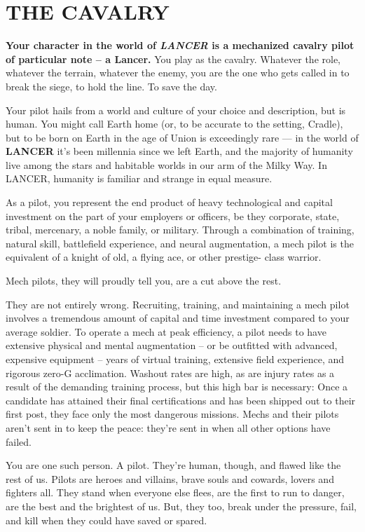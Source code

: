 \section{THE CAVALRY}

\textbf{Your character in the world of \textit{LANCER} is a mechanized cavalry pilot of particular note -- a
Lancer.} You play as the cavalry. Whatever the role, whatever the terrain, whatever the enemy,
you are the one who gets called in to break the siege, to hold the line. To save the day.

Your pilot hails from a world and culture of your choice and description, but is human. You might
call Earth home (or, to be accurate to the setting, Cradle), but to be born on Earth in the age of
Union is exceedingly rare — in the world of \textbf{LANCER} it’s been millennia since we left Earth, and
the majority of humanity live among the stars and habitable worlds in our arm of the Milky Way.
In LANCER, humanity is familiar and strange in equal measure.

As a pilot, you represent the end product of heavy technological and capital investment on the
part of your employers or officers, be they corporate, state, tribal, mercenary, a noble family, or
military. Through a combination of training, natural skill, battlefield experience, and neural
augmentation, a mech pilot is the equivalent of a knight of old, a flying ace, or other prestige-
class warrior.

Mech pilots, they will proudly tell you, are a cut above the rest.

They are not entirely wrong. Recruiting, training, and maintaining a mech pilot involves a
tremendous amount of capital and time investment compared to your average soldier. To operate
a mech at peak efficiency, a pilot needs to have extensive physical and mental augmentation --
or be outfitted with advanced, expensive equipment -- years of virtual training, extensive field
experience, and rigorous zero-G acclimation. Washout rates are high, as are injury rates as a
result of the demanding training process, but this high bar is necessary: Once a candidate has
attained their final certifications and has been shipped out to their first post, they face only the
most dangerous missions. Mechs and their pilots aren’t sent in to keep the peace: they’re sent in
when all other options have failed.

You are one such person. A pilot. They’re human, though, and flawed like the rest of us. Pilots
are heroes and villains, brave souls and cowards, lovers and fighters all. They stand when
everyone else flees, are the first to run to danger, are the best and the brightest of us. But, they
too, break under the pressure, fail, and kill when they could have saved or spared.

